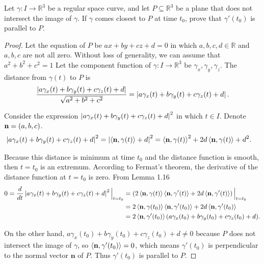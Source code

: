 \begin{exercise}{1.23}
	Let $\gamma: I \to \mathbb{R}^{3}$ be a regular space curve, and let $P \subseteq \mathbb{R}^{3}$ be a plane that does not intersect the image of $\gamma$. If $\gamma$ comes closest to $P$ at time $t_{0}$, prove that $\gamma'(t_{0})$ is parallel to $P$.
\end{exercise}

\begin{proof}
	Let the equation of $P$ be $ax + by + cz + d = 0$ in which $a, b, c, d\in\mathbb{R}$ and $a, b, c$ are not all zero. Without loss of generality, we can assume that $a^{2} + b^{2} + c^{2} = 1$ Let the component function of $\gamma: I \to \mathbb{R}^{3}$ be $\gamma_{x}, \gamma_{y}, \gamma_{z}$. The distance from $\gamma(t)$ to $P$ is
	\begin{align*}
		\frac{\left\vert{a\gamma_{x}(t) + b\gamma_{y}(t) + c\gamma_{z}(t) + d}\right\vert}{\sqrt{a^{2} + b^{2} + c^{2}}} = \left\vert{a\gamma_{x}(t) + b\gamma_{y}(t) + c\gamma_{z}(t) + d}\right\vert.
	\end{align*}

	Consider the expression $\left\vert{a\gamma_{x}(t) + b\gamma_{y}(t) + c\gamma_{z}(t) + d}\right\vert^{2}$ in which $t\in I$. Denote $\mathbf{n} = \left({a, b, c}\right)$.
	\begin{align*}
		\left\vert{a\gamma_{x}(t) + b\gamma_{y}(t) + c\gamma_{z}(t) + d}\right\vert^{2} & = \left\vert{\left\langle{\mathbf{n}, \gamma(t)}\right\rangle + d}\right\vert^{2} = \left\langle{\mathbf{n},\gamma(t)}\right\rangle^{2} + 2d\left\langle{\mathbf{n}, \gamma(t)}\right\rangle + d^{2}.
	\end{align*}

	Because this distance is minimum at time $t_{0}$ and the distance function is smooth, then $t = t_{0}$ is an extremum. According to Fermat's theorem, the derivative of the distance function at $t = t_{0}$ is zero. From Lemma 1.16
	\begin{align*}
		0 = \frac{d}{dt}\left\vert{a\gamma_{x}(t) + b\gamma_{y}(t) + c\gamma_{z}(t) + d}\right\vert^{2} \Bigl{\vert}_{t=t_{0}} & = \left(2\left\langle{\mathbf{n}, \gamma(t)}\right\rangle \left\langle{\mathbf{n}, \gamma'(t)}\right\rangle + 2d\left\langle{\mathbf{n}, \gamma'(t)}\right\rangle\right) \Bigl{\vert}_{t=t_{0}} \\
		                                                                                                      & = 2\left\langle{\mathbf{n}, \gamma(t_{0})}\right\rangle \left\langle{\mathbf{n}, \gamma'(t_{0})}\right\rangle + 2d\left\langle{\mathbf{n}, \gamma'(t_{0})}\right\rangle                         \\
		                                                                                                      & = 2\left\langle{\mathbf{n}, \gamma'(t_{0})}\right\rangle (a\gamma_{x}(t_{0}) + b\gamma_{y}(t_{0}) + c\gamma_{z}(t_{0}) + d).
	\end{align*}

	On the other hand, $a\gamma_{x}(t_{0}) + b\gamma_{y}(t_{0}) + c\gamma_{z}(t_{0}) + d \ne 0$ because $P$ does not intersect the image of $\gamma$, so $\left\langle{\mathbf{n}, \gamma'(t_{0})}\right\rangle = 0$, which means $\gamma'(t_{0})$ is perpendicular to the normal vector $\mathbf{n}$ of $P$. Thus $\gamma'(t_{0})$ is parallel to $P$.
\end{proof}

